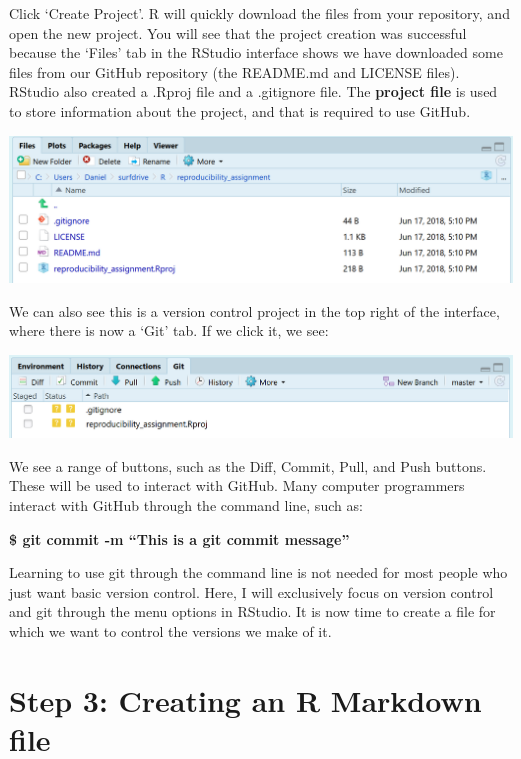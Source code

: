 \documentclass[
  oneside]{book}
\begin{document}
Click `Create Project'. R will quickly download the files from your repository,
and open the new project. You will see that the project creation was successful
because the `Files' tab in the RStudio interface shows we have downloaded some
files from our GitHub repository (the README.md and LICENSE files). RStudio also
created a .Rproj file and a .gitignore file. The \textbf{project file} is used to
store information about the project, and that is required to use GitHub.

\begin{center}\includegraphics[width=1\linewidth]{images/386831c4f089bbb56758718619859308} \end{center}

We can also see this is a version control project in the top right of the
interface, where there is now a `Git' tab. If we click it, we see:

\begin{center}\includegraphics[width=1\linewidth]{images/16361987bd66eec35a5b82b2efb9617b} \end{center}

We see a range of buttons, such as the Diff, Commit, Pull, and Push buttons.
These will be used to interact with GitHub. Many computer programmers interact
with GitHub through the command line, such as:

\textbf{\$ git commit -m ``This is a git commit message''}

Learning to use git through the command line is not needed for most people who
just want basic version control. Here, I will exclusively focus on version
control and git through the menu options in RStudio. It is now time to create a
file for which we want to control the versions we make of it.

\hypertarget{step-3-creating-an-r-markdown-file}{%
\section{Step 3: Creating an R Markdown file}\label{step-3-creating-an-r-markdown-file}}
\end{document}
